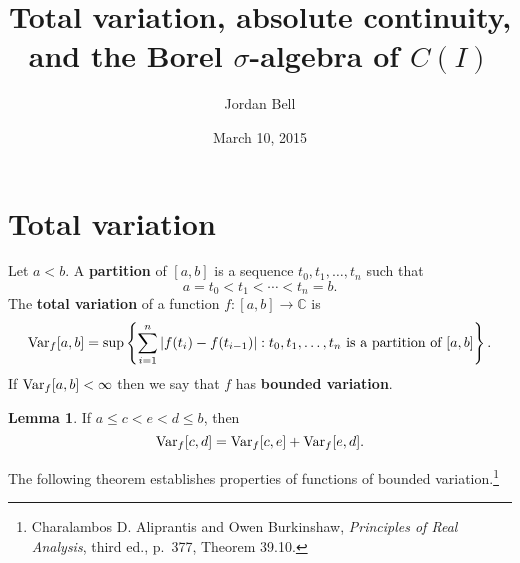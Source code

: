 \documentclass{article}
\newcommand{\Var}{\ensuremath\mathrm{Var}}
\theoremstyle{definition}
\newtheorem{lemma}[theorem]{Lemma}
\theoremstyle{definition}
\begin{document}
\title{Total variation, absolute continuity, and the Borel $\sigma$-algebra of $C(I)$}
\author{Jordan Bell}
\date{March 10, 2015}

\maketitle

\section{Total variation}
Let $a < b$.
A \textbf{partition} of $[a,b]$ is a sequence $t_0,t_1,\ldots,t_n$ such that
\[
a=t_0 <  t_1 < \cdots < t_n = b.
\]
The \textbf{total variation} of a function $f:[a,b] \to \mathbb{C}$ is
\[
\Var_f[a,b] = \sup\left\{ \sum_{i=1}^n |f(t_i)-f(t_{i-1})|: \textrm{$t_0,t_1,\ldots,t_n$ is a partition of $[a,b]$}\right\}.
\]
If $\Var_f[a,b]<\infty$ then we say that $f$ has \textbf{bounded variation}.


\begin{lemma}
If $a \leq c < e < d \leq b$, then
\[
\Var_f[c,d] = \Var_f[c,e]+\Var_f[e,d].
\]
\end{lemma}

The following theorem establishes properties of functions of bounded variation.\footnote{Charalambos D. Aliprantis and Owen Burkinshaw, {\em Principles of Real Analysis}, third ed.,
p.~377, Theorem 39.10.}
\end{document}
